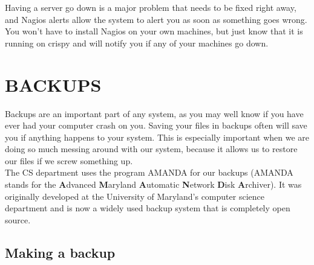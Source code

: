 \documentclass{article}
\begin{document}
Having a server go down is a major problem that needs to be fixed right away, and Nagios alerts allow the system to alert you as soon as something goes wrong. \\

You won't have to install Nagios on your own machines, but just know that it is running on crispy and will notify you if any of your machines go down.



\pagebreak

\section*{BACKUPS}

\indent\indent Backups are an important part of any system, as you may well know if you have ever had your computer crash on you. Saving your files in backups often will save you if anything happens to your system. This is especially important when we are doing so much messing around with our system, because it allows us to restore our files if we screw something up. \\

The CS department uses the program AMANDA for our backups (AMANDA stands for the \textbf{A}dvanced \textbf{M}aryland \textbf{A}utomatic \textbf{N}etwork \textbf{D}isk \textbf{A}rchiver). It was originally developed at the University of Maryland's computer science department and is now a widely used backup system that is completely open source. \\



\subsection*{Making a backup}
\end{document}
